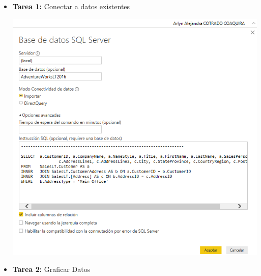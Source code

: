 \documentclass[12pt,letterpaper]{article}
\begin{document}
\begin{itemize}
	\item \textbf{Tarea 1:} Conectar a datos existentes
	\begin{center}
	\includegraphics[width=14cm]{./Imagenes/1}
	\end{center}
	\item \textbf{Tarea 2:} Graficar Datos


\end{itemize}
\end{document}
